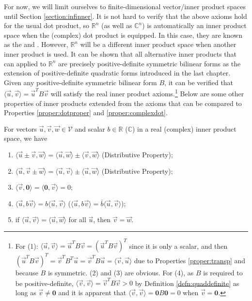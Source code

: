 For now, we will limit ourselves to finite-dimensional vector/inner product spaces until Section \ref{section:infinner}. It is not hard to verify that the above axioms hold for the usual dot product, so $\mathbb{R}^n$ (as well as $\mathbb{C}^n$) is automatically an inner product space when the (complex) dot product is equipped. In this case, they are known as the  and . However, $\mathbb{R}^n$ will be a different inner product space when another inner product is used. It can be shown that all alternative inner products that can applied to $\mathbb{R}^n$ are precisely positive-definite symmetric bilinear forms as the extension of positive-definite quadratic forms introduced in the last chapter. Given any positive-definite symmetric bilinear form $B$, it can be verified that $\langle \vec{u}, \vec{v} \rangle = \vec{u}^TB\vec{v}$ will satisfy the real inner product axioms.\footnote{For (1): $\langle \vec{u}, \vec{v} \rangle = \vec{u}^TB\vec{v} = (\vec{u}^TB\vec{v})^T$ since it is only a scalar, and then $(\vec{u}^TB\vec{v})^T = \vec{v}^TB^T\vec{u} = \vec{v}^TB\vec{u} = \langle \vec{v}, \vec{u} \rangle$ due to Properties \ref{proper:transp} and because $B$ is symmetric. (2) and (3) are obvious. For (4), as $B$ is required to be positive-definite, $\langle \vec{v}, \vec{v} \rangle = \vec{v}^TB\vec{v} > 0$ by Definition \ref{defn:quaddefinite} as long as $\vec{v} \neq \textbf{0}$ and it is apparent that $\langle \vec{v}, \vec{v} \rangle = \textbf{0}B\textbf{0} = 0$ when $\vec{v} = \textbf{0}$.} Below are some other properties of inner products extended from the axioms that can be compared to Properties \ref{proper:dotproper} and \ref{proper:complexdot}.
\begin{proper}
\label{proper:innerprod2}
For vectors $\vec{u}, \vec{v}, \vec{w} \in \mathcal{V}$ and scalar $b \in \mathbb{R}$ ($\mathbb{C}$) in a real (complex) inner product space, we have
\begin{enumerate}
    \item $\langle \vec{u} \pm \vec{v}, \vec{w} \rangle = \langle \vec{u}, \vec{w} \rangle \pm \langle \vec{v}, \vec{w} \rangle$ (Distributive Property);
    \item $\langle \vec{u}, \vec{v} \pm \vec{w} \rangle = \langle \vec{u}, \vec{v} \rangle \pm \langle \vec{u}, \vec{w} \rangle$ (Distributive Property);
    \item $\langle \vec{v}, \textbf{0} \rangle = \langle \textbf{0}, \vec{v} \rangle = 0$;
    \item $\langle \vec{u}, b\vec{v} \rangle = b\langle \vec{u}, \vec{v} \rangle$ ($\langle \vec{u}, b\vec{v} \rangle = \bar{b}\langle \vec{u}, \vec{v} \rangle$);
    \item if $\langle \vec{u}, \vec{v} \rangle = \langle \vec{u}, \vec{w} \rangle$ for all $\vec{u}$, then $\vec{v} = \vec{w}$.
\end{enumerate}
\end{proper}
